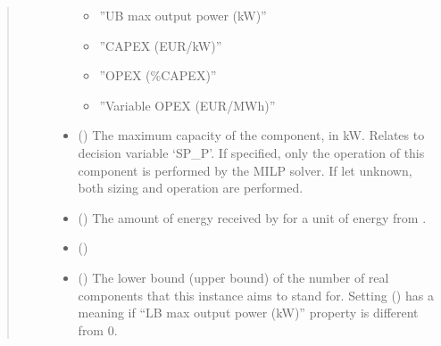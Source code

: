 \documentclass[letterpaper,10pt,english]{sphinxmanual}
\begin{document}
\begin{fulllineitems}
\begin{fulllineitems}
\begin{quote}
\begin{description}
\begin{itemize}
\begin{itemize}
\item {} 
\sphinxAtStartPar
”UB max output power (kW)”

\item {} 
\sphinxAtStartPar
”CAPEX (EUR/kW)”

\item {} 
\sphinxAtStartPar
”OPEX (\%CAPEX)”

\item {} 
\sphinxAtStartPar
”Variable OPEX (EUR/MWh)”

\end{itemize}


\item {} 
\sphinxAtStartPar
{} (\sphinxstyleliteralemphasis{\sphinxupquote{, }}) \textendash{} The maximum capacity of the component, in kW.
Relates to decision variable ‘SP\_P’.
If specified, only the operation of this component is performed by the MILP solver.
If let unknown, both sizing and operation are performed.

\item {} 
\sphinxAtStartPar
{} (\sphinxstyleliteralemphasis{\sphinxupquote{, }}\sphinxstyleliteralemphasis{\sphinxupquote{, }}\sphinxstyleliteralemphasis{\sphinxupquote{, }}) \textendash{} The amount of energy received by  for a unit of energy from .

\item {} 
\sphinxAtStartPar
{} (\sphinxstyleliteralemphasis{\sphinxupquote{, }}) \textendash{} 

\item {} 
\sphinxAtStartPar
{} (\sphinxstyleliteralemphasis{\sphinxupquote{, }}\sphinxstyleliteralemphasis{\sphinxupquote{, }}) \textendash{} The lower bound (upper bound) of the number of real components that this instance aims to stand for.
Setting  () has a meaning if “LB max output power (kW)” property is
different from 0.


\end{itemize}
\end{description}
\end{quote}
\end{fulllineitems}
\end{fulllineitems}
\end{document}
